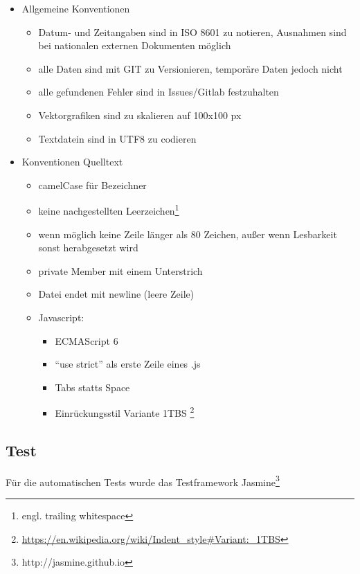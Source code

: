\begin{itemize}
\item Allgemeine Konventionen
	\begin{itemize}
	\item Datum- und Zeitangaben sind in ISO 8601 zu notieren, Ausnahmen sind bei nationalen externen Dokumenten möglich
	\item alle Daten sind mit GIT zu Versionieren, temporäre Daten jedoch nicht
	\item alle gefundenen Fehler sind in Issues/Gitlab festzuhalten
	\item Vektorgrafiken sind zu skalieren auf 100x100 px
	\item Textdatein sind in UTF8 zu codieren
	\end{itemize}
\item Konventionen Quelltext
	\begin{itemize}
	\item camelCase für Bezeichner
	\item keine nachgestellten Leerzeichen\footnote{engl. trailing whitespace}
	\item wenn möglich keine Zeile länger als 80 Zeichen, außer wenn Lesbarkeit sonst herabgesetzt wird
	\item private Member mit einem Unterstrich
	\item Datei endet mit newline (leere Zeile)
	\item Javascript:
		\begin{itemize}
		\item ECMAScript 6
		\item "`use strict"' als erste Zeile eines .js
		\item Tabs statts Space
		\item Einrückungsstil Variante 1TBS \footnote{\url{https://en.wikipedia.org/wiki/Indent_style\#Variant:_1TBS}}
		\end{itemize}
	\end{itemize}
\end{itemize}


\subsection{Test}
Für die automatischen Tests wurde das Testframework Jasmine\footnote{http://jasmine.github.io}
